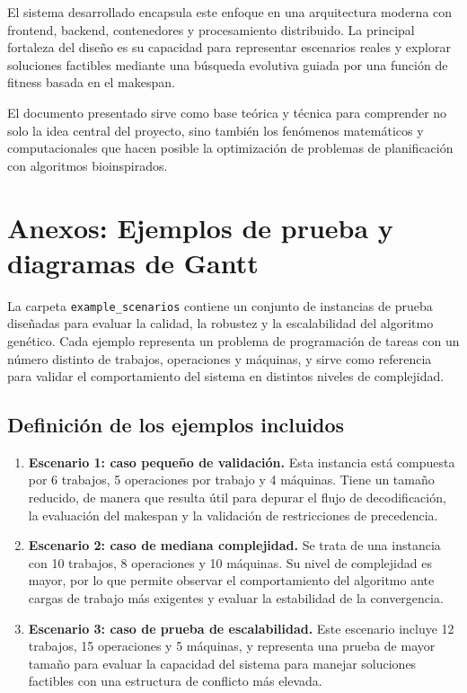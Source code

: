 \documentclass[11pt,a4paper]{article}
\begin{document}
El sistema desarrollado encapsula este enfoque en una arquitectura moderna con frontend, backend, contenedores y procesamiento distribuido. La principal fortaleza del diseño es su capacidad para representar escenarios reales y explorar soluciones factibles mediante una búsqueda evolutiva guiada por una función de fitness basada en el makespan.

El documento presentado sirve como base teórica y técnica para comprender no solo la idea central del proyecto, sino también los fenómenos matemáticos y computacionales que hacen posible la optimización de problemas de planificación con algoritmos bioinspirados.

\clearpage
\appendix
\section*{Anexos: Ejemplos de prueba y diagramas de Gantt}

La carpeta \texttt{example\_scenarios} contiene un conjunto de instancias de prueba diseñadas para evaluar la calidad, la robustez y la escalabilidad del algoritmo genético. Cada ejemplo representa un problema de programación de tareas con un número distinto de trabajos, operaciones y máquinas, y sirve como referencia para validar el comportamiento del sistema en distintos niveles de complejidad.

\subsection*{Definición de los ejemplos incluidos}

\begin{enumerate}[leftmargin=1.8em]
    \item \textbf{Escenario 1: caso pequeño de validación.} Esta instancia está compuesta por 6 trabajos, 5 operaciones por trabajo y 4 máquinas. Tiene un tamaño reducido, de manera que resulta útil para depurar el flujo de decodificación, la evaluación del makespan y la validación de restricciones de precedencia.

    \item \textbf{Escenario 2: caso de mediana complejidad.} Se trata de una instancia con 10 trabajos, 8 operaciones y 10 máquinas. Su nivel de complejidad es mayor, por lo que permite observar el comportamiento del algoritmo ante cargas de trabajo más exigentes y evaluar la estabilidad de la convergencia.

    \item \textbf{Escenario 3: caso de prueba de escalabilidad.} Este escenario incluye 12 trabajos, 15 operaciones y 5 máquinas, y representa una prueba de mayor tamaño para evaluar la capacidad del sistema para manejar soluciones factibles con una estructura de conflicto más elevada.
\end{enumerate}
\end{document}
